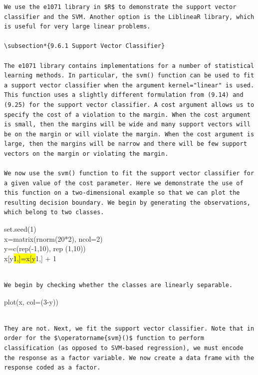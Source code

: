 \documentclass[10pt]{article}
\begin{document}
\begin{verbatim}
We use the e1071 library in $R$ to demonstrate the support vector classifier and the SVM. Another option is the LiblineaR library, which is useful for very large linear problems.

\subsection*{9.6.1 Support Vector Classifier}

The e1071 library contains implementations for a number of statistical learning methods. In particular, the svm() function can be used to fit a support vector classifier when the argument kernel="linear" is used. This function uses a slightly different formulation from (9.14) and (9.25) for the support vector classifier. A cost argument allows us to specify the cost of a violation to the margin. When the cost argument is small, then the margins will be wide and many support vectors will be on the margin or will violate the margin. When the cost argument is large, then the margins will be narrow and there will be few support vectors on the margin or violating the margin.

We now use the svm() function to fit the support vector classifier for a given value of the cost parameter. Here we demonstrate the use of this function on a two-dimensional example so that we can plot the resulting decision boundary. We begin by generating the observations, which belong to two classes.
\end{verbatim}

\begin{displayquote}
set.seed(1)\\
x=matrix(rnorm(20*2), ncol=2)\\
y=c(rep(-1,10), rep (1,10))\\
x[y\hl{1,]=x[y}1,] + 1
\end{displayquote}

\begin{verbatim}

We begin by checking whether the classes are linearly separable.
\end{verbatim}

\begin{displayquote}
plot(x, col=(3-y))
\end{displayquote}

\begin{verbatim}

They are not. Next, we fit the support vector classifier. Note that in order for the $\operatorname{svm}()$ function to perform classification (as opposed to SVM-based regression), we must encode the response as a factor variable. We now create a data frame with the response coded as a factor.
\end{verbatim}
\end{document}
